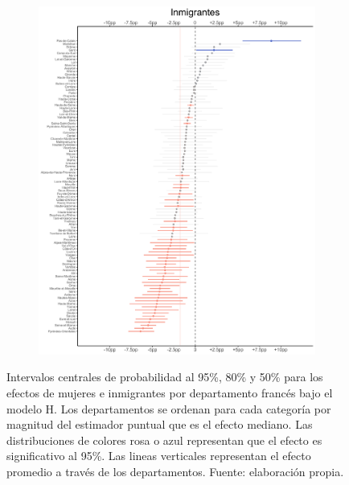 \begin{figure}
\begin{subfigure}{0.45\textwidth}
	\includegraphics[width = \textwidth]{Figs/Efectos/Efectos_Inm_Modelo_H}
	\end{subfigure}
	\caption{Intervalos centrales de probabilidad al 95\%, 80\% y 50\% para los efectos de mujeres e inmigrantes por departamento francés bajo el modelo H. Los departamentos se ordenan para cada categoría por magnitud del estimador puntual que es el efecto mediano. Las distribuciones de colores rosa o azul representan que el efecto es significativo al 95\%. Las lineas verticales representan el efecto promedio a través de los departamentos. Fuente: elaboración propia.}
	\label{fig:Efectos_Muj_Inm}
\end{figure}


